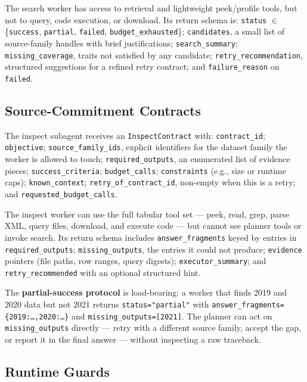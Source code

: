 The search worker has access to retrieval and lightweight peek/profile tools, but not to query, code execution, or download. Its return schema is: \texttt{status} $\in$ \{\texttt{success}, \texttt{partial}, \texttt{failed}, \texttt{budget\_exhausted}\}; \texttt{candidates}, a small list of source-family handles with brief justifications; \texttt{search\_summary}; \texttt{missing\_coverage}, traits not satisfied by any candidate; \texttt{retry\_recommendation}, structured suggestions for a refined retry contract; and \texttt{failure\_reason} on \texttt{failed}.

\subsection{Source-Commitment Contracts}

The inspect subagent receives an \texttt{InspectContract} with: \texttt{contract\_id}; \texttt{objective}; \texttt{source\_family\_ids}, explicit identifiers for the dataset family the worker is allowed to touch; \texttt{required\_outputs}, an enumerated list of evidence pieces; \texttt{success\_criteria}; \texttt{budget\_calls}; \texttt{constraints} (e.g., size or runtime caps); \texttt{known\_context}; \texttt{retry\_of\_contract\_id}, non-empty when this is a retry; and \texttt{requested\_budget\_calls}.

The inspect worker can use the full tabular tool set --- peek, read, grep, parse XML, query files, download, and execute code --- but cannot see planner tools or invoke search. Its return schema includes \texttt{answer\_fragments} keyed by entries in \texttt{required\_outputs}; \texttt{missing\_outputs}, the entries it could not produce; \texttt{evidence} pointers (file paths, row ranges, query digests); \texttt{executor\_summary}; and \texttt{retry\_recommended} with an optional structured hint.

The \textbf{partial-success protocol} is load-bearing: a worker that finds 2019 and 2020 data but not 2021 returns \texttt{status="partial"} with \texttt{answer\_fragments=\{2019:\dots,2020:\dots\}} and \texttt{missing\_outputs=[2021]}. The planner can act on \texttt{missing\_outputs} directly --- retry with a different source family, accept the gap, or report it in the final answer --- without inspecting a raw traceback.

\subsection{Runtime Guards}

